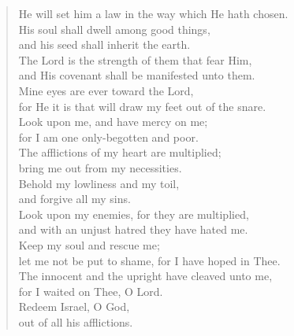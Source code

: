 {\begin{verse}
				He will set him a law in the way which He hath chosen.\nolinebreak\\
				His soul shall dwell among good things,\nolinebreak\\
				and his seed shall inherit the earth.\nolinebreak\\
				The Lord is the strength of them that fear Him,\nolinebreak\\
				and His covenant shall be manifested unto them.\nolinebreak\\
				Mine eyes are ever toward the Lord,\nolinebreak\\
				for He it is that will draw my feet out of the snare.\nolinebreak\\
				Look upon me, and have mercy on me;\nolinebreak\\
				for I am one only-begotten and poor.\nolinebreak\\
				The afflictions of my heart are multiplied;\nolinebreak\\
				bring me out from my necessities.\nolinebreak\\
				Behold my lowliness and my toil,\nolinebreak\\
				and forgive all my sins.\nolinebreak\\
				Look upon my enemies, for they are multiplied,\nolinebreak\\
				and with an unjust hatred they have hated me.\nolinebreak\\
				Keep my soul and rescue me;\nolinebreak\\
				let me not be put to shame, for I have hoped in Thee.\nolinebreak\\
				The innocent and the upright have cleaved unto me,\nolinebreak\\
				for I waited on Thee, O Lord.\nolinebreak\\
				Redeem Israel, O God,\nolinebreak\\
				out of all his afflictions.
			\end{verse}
}
